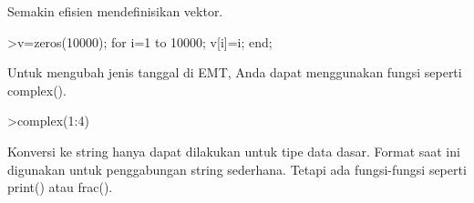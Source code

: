 \documentclass[12pt,arial,letterpaper]{book}
\begin{document}
\begin{eulernootebook}
\begin{eulercomment}
\begin{eulercomment}
\begin{eulernootebook}
\begin{eulercomment}
\begin{eulercomment}
\begin{eulercomment}
\begin{eulercomment}
\begin{eulercomment}
\begin{eulercomment}
\begin{eulercomment}
\begin{eulercomment}
\begin{eulercomment}
\begin{eulercomment}
\begin{eulercomment}
\begin{eulercomment}
Semakin efisien mendefinisikan vektor.
\end{eulercomment}
\begin{eulerprompt}
>v=zeros(10000); for i=1 to 10000; v[i]=i; end;
\end{eulerprompt}
\begin{eulercomment}
Untuk mengubah jenis tanggal di EMT, Anda dapat menggunakan fungsi
seperti complex().
\end{eulercomment}
\begin{eulerprompt}
>complex(1:4)
\end{eulerprompt}
\begin{euleroutput}
  [ 1+0i ,  2+0i ,  3+0i ,  4+0i  ]
\end{euleroutput}
\begin{eulercomment}
Konversi ke string hanya dapat dilakukan untuk tipe data dasar. Format
saat ini digunakan untuk penggabungan string sederhana. Tetapi ada
fungsi-fungsi seperti print() atau frac().


\end{eulercomment}
\end{eulercomment}
\end{eulercomment}
\end{eulercomment}
\end{eulercomment}
\end{eulercomment}
\end{eulercomment}
\end{eulercomment}
\end{eulercomment}
\end{eulercomment}
\end{eulercomment}
\end{eulercomment}
\end{eulernootebook}
\end{eulercomment}
\end{eulercomment}
\end{eulernootebook}
\end{document}

